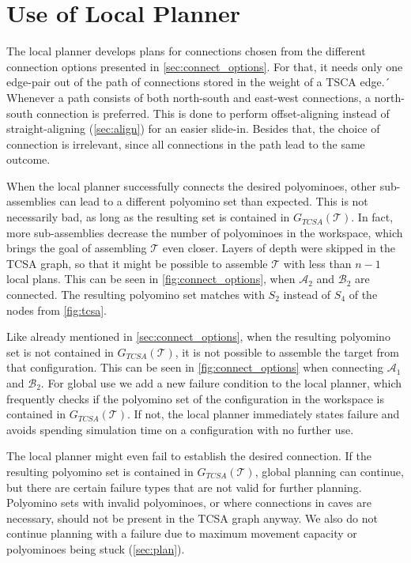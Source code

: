 \section{Use of Local Planner}
\label{sec:local_in_global}

The local planner develops plans for connections chosen from the different connection options presented in \autoref{sec:connect_options}.
For that, it needs only one edge-pair out of the path of connections stored in the weight of a TSCA edge.´
Whenever a path consists of both north-south and east-west connections, a north-south connection is preferred.
This is done to perform offset-aligning instead of straight-aligning (\autoref{sec:align}) for an easier slide-in.
Besides that, the choice of connection is irrelevant, since all connections in the path lead to the same outcome.

When the local planner successfully connects the desired polyominoes, other sub-assemblies can lead to a different polyomino set than expected.
This is not necessarily bad, as long as the resulting set is contained in $G_{\textit{TCSA}}(\mathcal{T})$.
In fact, more sub-assemblies decrease the number of polyominoes in the workspace, which brings the goal of assembling $\mathcal{T}$ even closer.
Layers of depth were skipped in the TCSA graph, so that it might be possible to assemble $\mathcal{T}$ with less than $n-1$ local plans.
This can be seen in \autoref{fig:connect_options}, when $\mathcal{A}_2$ and $\mathcal{B}_2$ are connected. 
The resulting polyomino set matches with $S_2$ instead of $S_4$ of the nodes from \autoref{fig:tcsa}.

Like already mentioned in \autoref{sec:connect_options}, when the resulting polyomino set is not contained in $G_{\textit{TCSA}}(\mathcal{T})$, it is not possible to assemble the target from that configuration.
This can be seen in \autoref{fig:connect_options} when connecting $\mathcal{A}_1$ and $\mathcal{B}_2$.
For global use we add a new failure condition to the local planner, which frequently checks if the polyomino set of the configuration in the workspace is contained in $G_{\textit{TCSA}}(\mathcal{T})$.
If not, the local planner immediately states failure and avoids spending simulation time on a configuration with no further use.

The local planner might even fail to establish the desired connection.
If the resulting polyomino set is contained in $G_{\textit{TCSA}}(\mathcal{T})$, global planning can continue, but there are certain failure types that are not valid for further planning.
Polyomino sets with invalid polyominoes, or where connections in caves are necessary, should not be present in the TCSA graph anyway.
We also do not continue planning with a failure due to maximum movement capacity or polyominoes being stuck (\autoref{sec:plan}).

